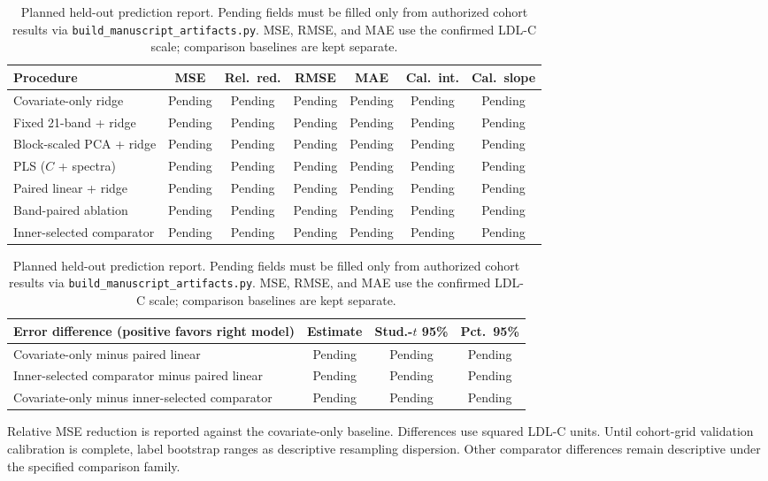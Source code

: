 \documentclass[preprint,12pt]{elsarticle}
\begin{document}
\begin{table}[ht]
\centering
\caption{Planned held-out prediction report. Pending fields must be filled only from authorized cohort results via \texttt{build\_manuscript\_artifacts.py}. MSE, RMSE, and MAE use the confirmed LDL-C scale; comparison baselines are kept separate.}
\label{tab:primary_results}
\footnotesize
\setlength{\tabcolsep}{3.5pt}
\begin{tabularx}{\textwidth}{@{}>{\raggedright\arraybackslash}X c c c c c c@{}}
\toprule
Procedure & MSE & Rel.\ red. & RMSE & MAE & Cal.\ int. & Cal.\ slope \\
\midrule
Covariate-only ridge & Pending & Pending & Pending & Pending & Pending & Pending \\
Fixed 21-band + ridge & Pending & Pending & Pending & Pending & Pending & Pending \\
Block-scaled PCA + ridge & Pending & Pending & Pending & Pending & Pending & Pending \\
PLS ($C$ + spectra) & Pending & Pending & Pending & Pending & Pending & Pending \\
Paired linear + ridge & Pending & Pending & Pending & Pending & Pending & Pending \\
Band-paired ablation & Pending & Pending & Pending & Pending & Pending & Pending \\
Inner-selected comparator & Pending & Pending & Pending & Pending & Pending & Pending \\
\bottomrule
\end{tabularx}

\medskip
\begin{tabularx}{\textwidth}{@{}>{\raggedright\arraybackslash}X c c c@{}}
\toprule
Error difference (positive favors right model) & Estimate & Stud.-$t$ 95\% & Pct.\ 95\% \\
\midrule
Covariate-only minus paired linear & Pending & Pending & Pending \\
Inner-selected comparator minus paired linear & Pending & Pending & Pending \\
Covariate-only minus inner-selected comparator & Pending & Pending & Pending \\
\bottomrule
\end{tabularx}

\smallskip
\raggedright Relative MSE reduction is reported against the covariate-only baseline. Differences use squared LDL-C units. Until cohort-grid validation calibration is complete, label bootstrap ranges as descriptive resampling dispersion. Other comparator differences remain descriptive under the specified comparison family.
\end{table}
\end{document}
